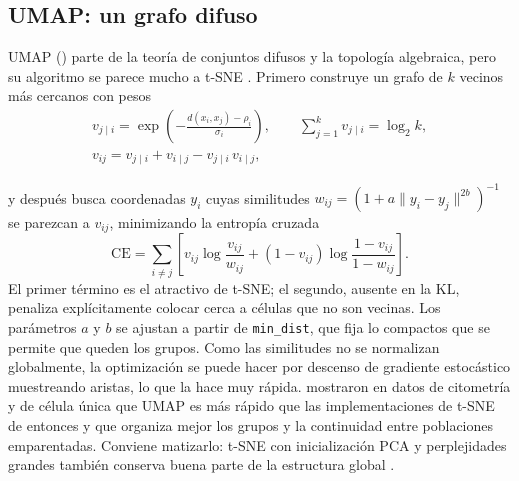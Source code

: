 \subsection{UMAP: un grafo difuso}

UMAP () parte de la teoría de conjuntos difusos y la topología algebraica, pero su algoritmo se parece mucho a t-SNE \parencite{c12-mcinnes2018}. Primero construye un grafo de $k$ vecinos más cercanos con pesos
\begin{equation}\label{eq:12-umap-v}
\begin{gathered}
v_{j\mid i}=\exp\!\left(-\frac{d(x_i,x_j)-\rho_i}{\sigma_i}\right),\qquad \sum_{j=1}^{k} v_{j\mid i}=\log_2 k,\\[2pt]
v_{ij}=v_{j\mid i}+v_{i\mid j}-v_{j\mid i}\,v_{i\mid j},
\end{gathered}
\end{equation}
\begin{simbolos}
\end{simbolos}
y después busca coordenadas $y_i$ cuyas similitudes $w_{ij}=(1+a\lVert y_i-y_j\rVert^{2b})^{-1}$ se parezcan a $v_{ij}$, minimizando la entropía cruzada
\begin{equation}\label{eq:12-umap-ce}
\mathrm{CE}=\sum_{i\neq j}\left[v_{ij}\log\frac{v_{ij}}{w_{ij}}+\left(1-v_{ij}\right)\log\frac{1-v_{ij}}{1-w_{ij}}\right].
\end{equation}
El primer término es el atractivo de t-SNE; el segundo, ausente en la KL, penaliza explícitamente colocar cerca a células que no son vecinas. Los parámetros $a$ y $b$ se ajustan a partir de \texttt{min\_dist}, que fija lo compactos que se permite que queden los grupos. Como las similitudes no se normalizan globalmente, la optimización se puede hacer por descenso de gradiente estocástico muestreando aristas, lo que la hace muy rápida. \textcite{c12-becht2019} mostraron en datos de citometría y de célula única que UMAP es más rápido que las implementaciones de t-SNE de entonces y que organiza mejor los grupos y la continuidad entre poblaciones emparentadas. Conviene matizarlo: t-SNE con inicialización PCA y perplejidades grandes también conserva buena parte de la estructura global \parencite{c12-kobak2019}.

